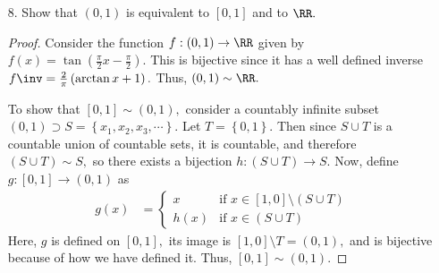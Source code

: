 \documentclass{article}
\begin{document}
\begin{itemize}
\begin{proof}
			Since $g$ is injective, it is a bijection from $C\to g(C)=\left\{ g(c):c\in C \right\}.$ Since $g(C)\subset A,$ it is countable, so there exists a bijection $h:g(C)\to A.$ Thus, the composition $h\circ g:C\to g(C)\to A$ is a bijection, so $C\sim A$ and thus $C$ is countable.
		\end{proof}

	\item[8.] Show that $(0, 1)$ is equivalent to $[0, 1]$ and to $\RR.$
		\begin{proof}
			Consider the function $f:(0, 1)\to\RR$ given by $f(x)=\tan\left( \frac{\pi}{2}x - \frac{\pi}{2} \right).$ This is bijective since it has a well defined inverse $f\inv = \frac{2}{\pi}\left( \arctan x + 1 \right).$ Thus, $(0, 1)\sim\RR.$

			To show that $[0, 1]\sim (0, 1),$ consider a countably infinite subset $(0, 1)\supset S=\left\{ x_1, x_2, x_3, \cdots \right\}.$ Let $T=\left\{ 0, 1\right\}.$  Then since $S\cup T$ is a countable union of countable sets, it is countable, and therefore $(S\cup T)\sim S,$ so there exists a bijection $h:(S\cup T)\to S.$ Now, define $g:[0, 1]\to(0, 1)$ as
			\begin{align*}
				g(x) &= \begin{cases}
					x & \text{if }x\in[1, 0]\setminus (S\cup T) \\
					h(x) & \text{if } x\in (S\cup T)
				\end{cases}
			\end{align*}
			Here, $g$ is defined on $[0, 1],$ its image is $[1, 0]\setminus T = (0, 1),$ and is bijective because of how we have defined it. Thus, $[0, 1]\sim(0, 1).$
	\end{proof}


\end{itemize}
\end{document}
